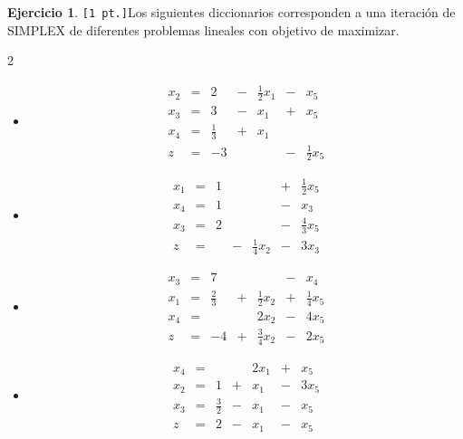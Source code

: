 \documentclass[a4paper,oneside,11pt]{amsart}
\theoremstyle{definition}
\newtheorem{quest}{Ejercicio}
\begin{document}


\begin{quest} \verb|[1 pt.]|Los siguientes diccionarios corresponden a una iteración de SIMPLEX de diferentes problemas lineales con objetivo de maximizar.

\begin{multicols}{2}
    \begin{itemize}
        \item[1)]
            \[
            \begin{array}{rrrrrrr}
                x_2&=&2&-&\frac{1}{2}x_1&-&x_5\\
                x_3&=&3&-&x_1&+&x_5\\
                x_4&=&\frac{1}{3}&+&x_1&&\\ \hline
                z&=&-3&&&-&\frac{1}{2}x_5
            \end{array}
            \]
        \item[3)]
            \[
            \begin{array}{rrrrrrr}
                x_1&=&1&&&+&\frac{1}{2}x_5\\
                x_4&=&1&&&-&x_3\\
                x_3&=&2&&&-&\frac{4}{3}x_5\\ \hline
                z&=&&-&\frac{1}{4}x_2&-&3x_3
            \end{array}
            \]
        \item[2)]
            \[
            \begin{array}{rrrrrrr}
                x_3&=&7&&&-&x_4\\
                x_1&=&\frac{2}{3}&+&\frac{1}{2}x_2&+&\frac{1}{4}x_5\\
                x_4&=&&&2x_2&-&4x_5\\ \hline
                z&=&-4&+&\frac{3}{4}x_2&-&2x_5
            \end{array}
            \]
        \item[4)]            \[
            \begin{array}{rrrrrrr}
                x_4&=&&&2x_1&+&x_5\\
                x_2&=&1&+&x_1&-&3x_5\\
                x_3&=&\frac{3}{2}&-&x_1&-&x_5\\ \hline
                z&=&2&-&x_1&-&x_5
            \end{array}
            \]


\end{itemize}
\end{multicols}
\end{quest}
\end{document}
